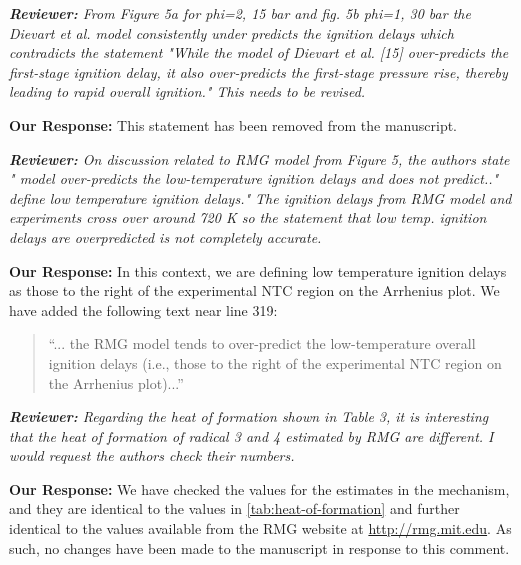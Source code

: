 \documentclass{article}
\newenvironment{reviewer}{\vspace{0.5\baselineskip}\begingroup\itshape\textbf{Reviewer:}}{\endgroup\vspace{0.5\baselineskip}}
\newenvironment{response}{\vspace{0.5\baselineskip}\textbf{Our Response:}}{\vspace{0.5\baselineskip}}
\begin{document}
\begin{reviewer}
    From Figure 5a for phi=2, 15 bar and  fig. 5b phi=1, 30 bar the  Dievart et al. model
    consistently under predicts the ignition delays which contradicts the statement "While the
    model of Dievart et al. [15] over-predicts the first-stage ignition delay, it also over-predicts
    the first-stage pressure rise, thereby leading  to rapid overall ignition." This needs to be
    revised.
\end{reviewer}

\begin{response}
    This statement has been removed from the manuscript.
\end{response}

\begin{reviewer}
    On discussion related to RMG model from Figure 5, the authors state " model over-predicts the
    low-temperature ignition delays and does not predict.." define low temperature ignition delays."
    The ignition delays from RMG model and experiments cross over around 720 K so the statement that
    low temp. ignition delays are overpredicted is not completely accurate.
\end{reviewer}

\begin{response}
    In this context, we are defining low temperature ignition delays as those to the right of the
    experimental NTC region on the Arrhenius plot. We have added the following text near line 319:

    \begin{quote}
        ``... the RMG model tends to over-predict the low-temperature overall ignition delays (i.e.,
        those to the right of the experimental NTC region on the Arrhenius plot)...''
    \end{quote}
\end{response}

\begin{reviewer}
    Regarding the heat of formation shown in Table 3, it is interesting that the heat of formation
    of radical 3 and 4 estimated by RMG are different. I would request the authors check their
    numbers.
\end{reviewer}

\begin{response}
    We have checked the values for the estimates in the mechanism, and they are identical to the
    values in \cref{tab:heat-of-formation} and further identical to the values available from the
    RMG website at \url{http://rmg.mit.edu}. As such, no changes have been made to the manuscript in
    response to this comment.
\end{response}
\end{document}

